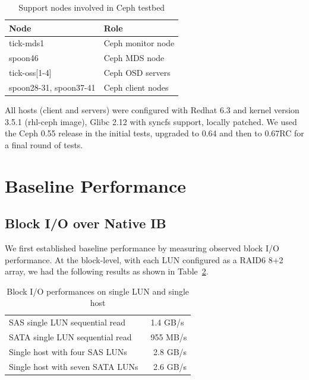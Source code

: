 \documentclass{article}
\begin{document}
\begin{table}[H]
\centering
    \begin{tabular}{ll}
    \toprule
    Node & Role \\
    \midrule
    tick-mds1 & Ceph monitor node \\
    spoon46 & Ceph MDS node \\
    tick-oss[1-4] & Ceph OSD servers \\
    spoon28-31, spoon37-41 & Ceph client nodes \\
    \bottomrule

    \end{tabular}
\caption{Support nodes involved in Ceph testbed}
\label{tbl:ceph-test-nodes}
\end{table}

All hosts  (client and servers) were configured with Redhat 6.3 and kernel
version 3.5.1 (rhl-ceph image), Glibc 2.12 with syncfs support, locally patched.
We used the Ceph 0.55 release in the initial tests, upgraded to 0.64 and then to
0.67RC for a final round of tests.



\section{Baseline Performance}
\label{sec:block-io}

\subsection{Block I/O over Native IB}
We first established baseline performance by measuring observed block I/O
performance.
At the block-level, with each LUN configured as a RAID6 8+2 array, we had the
following results as shown in Table~\ref{tbl:block-io-baseline}.

\begin{table}[htb]
\centering
\begin{tabular}{ll}
    \toprule
    SAS single LUN sequential read & ~1.4 GB/s \\
    SATA single LUN sequential read & ~955 MB/s \\[0.5em]
    Single host with four SAS LUNs & ~ 2.8 GB/s \\
    Single host with seven SATA LUNs & ~ 2.6 GB/s \\
    \bottomrule
\end{tabular}
\caption{Block I/O performances on single LUN and single host}
\label{tbl:block-io-baseline}
\end{table}
\end{document}
